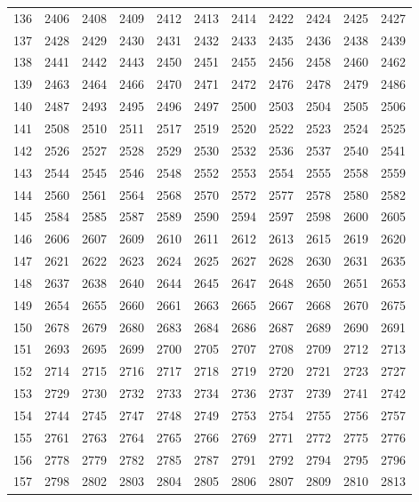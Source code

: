 \begin{longtable}{|r|rrrrrrrrrr|}
  136 & 2406 & 2408 & 2409 & 2412 & 2413 & 2414 & 2422 & 2424 & 2425 & 2427 \\ 
  137 & 2428 & 2429 & 2430 & 2431 & 2432 & 2433 & 2435 & 2436 & 2438 & 2439 \\ 
  138 & 2441 & 2442 & 2443 & 2450 & 2451 & 2455 & 2456 & 2458 & 2460 & 2462 \\ 
  139 & 2463 & 2464 & 2466 & 2470 & 2471 & 2472 & 2476 & 2478 & 2479 & 2486 \\ 
  140 & 2487 & 2493 & 2495 & 2496 & 2497 & 2500 & 2503 & 2504 & 2505 & 2506 \\ 
  141 & 2508 & 2510 & 2511 & 2517 & 2519 & 2520 & 2522 & 2523 & 2524 & 2525 \\ 
  142 & 2526 & 2527 & 2528 & 2529 & 2530 & 2532 & 2536 & 2537 & 2540 & 2541 \\ 
  143 & 2544 & 2545 & 2546 & 2548 & 2552 & 2553 & 2554 & 2555 & 2558 & 2559 \\ 
  144 & 2560 & 2561 & 2564 & 2568 & 2570 & 2572 & 2577 & 2578 & 2580 & 2582 \\ 
  145 & 2584 & 2585 & 2587 & 2589 & 2590 & 2594 & 2597 & 2598 & 2600 & 2605 \\ 
  146 & 2606 & 2607 & 2609 & 2610 & 2611 & 2612 & 2613 & 2615 & 2619 & 2620 \\ 
  147 & 2621 & 2622 & 2623 & 2624 & 2625 & 2627 & 2628 & 2630 & 2631 & 2635 \\ 
  148 & 2637 & 2638 & 2640 & 2644 & 2645 & 2647 & 2648 & 2650 & 2651 & 2653 \\ 
  149 & 2654 & 2655 & 2660 & 2661 & 2663 & 2665 & 2667 & 2668 & 2670 & 2675 \\ 
  150 & 2678 & 2679 & 2680 & 2683 & 2684 & 2686 & 2687 & 2689 & 2690 & 2691 \\ 
  151 & 2693 & 2695 & 2699 & 2700 & 2705 & 2707 & 2708 & 2709 & 2712 & 2713 \\ 
  152 & 2714 & 2715 & 2716 & 2717 & 2718 & 2719 & 2720 & 2721 & 2723 & 2727 \\ 
  153 & 2729 & 2730 & 2732 & 2733 & 2734 & 2736 & 2737 & 2739 & 2741 & 2742 \\ 
  154 & 2744 & 2745 & 2747 & 2748 & 2749 & 2753 & 2754 & 2755 & 2756 & 2757 \\ 
  155 & 2761 & 2763 & 2764 & 2765 & 2766 & 2769 & 2771 & 2772 & 2775 & 2776 \\ 
  156 & 2778 & 2779 & 2782 & 2785 & 2787 & 2791 & 2792 & 2794 & 2795 & 2796 \\ 
  157 & 2798 & 2802 & 2803 & 2804 & 2805 & 2806 & 2807 & 2809 & 2810 & 2813 \\ 

\end{longtable}

